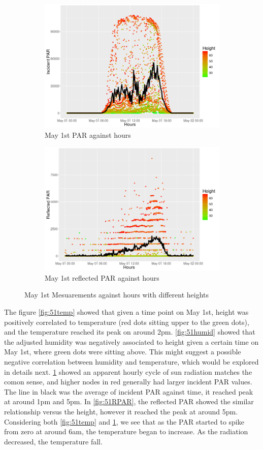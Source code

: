 \documentclass[11pt]{article}
\begin{document}
{\begin{figure}[H]
\begin{subfigure}{.5\textwidth}
\centering
\includegraphics[width=0.88\linewidth,height=0.5\linewidth]{51_par.png}
\caption{May 1st PAR against hours}
\label{fig:51par}
\end{subfigure}%
\begin{subfigure}{.5\textwidth}
\centering
\includegraphics[width=0.88\linewidth,height=0.5\linewidth]{51_rpar.png}
\caption{May 1st reflected PAR against hours}
\label{fig:51rpar}
\end{subfigure}
\caption{May 1st Mesuarements against hours with different heights}
\end{figure}%
The figure \ref{fig:51temp} showed that given a time point on May 1st, height was positively correlated to temperature (red dots sitting upper to the green dots), and the temperature reached its peak on around 2pm. \ref{fig:51humid} showed that the adjusted humidity was negatively associated to height given a certain time on May 1st, where green dots were sitting above. This might suggest a possible negative correlation between humidity and temperature, which would be explored in details next. \ref{fig:51par} showed an apparent hourly cycle of sun radiation matches the comon sense, and higher nodes in red generally had larger incident PAR values. The line in black was the average of incident PAR against time, it reached peak at around 1pm and 5pm. In \ref{fig:51RPAR}, the reflected PAR showed the similar relationship versus the height, however it reached the peak at around 5pm. Considering both \ref{fig:51temp} and \ref{fig:51par}, we see that as the PAR started to spike from zero at around 6am, the temperature began to increase. As the radiation decreased, the temperature fall.\\
}
\end{document}
